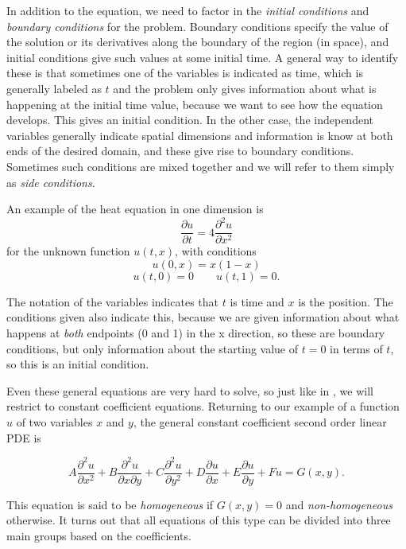 In addition to the equation, we need to factor in the \emph{initial conditions} and \emph{boundary conditions} for the problem. Boundary conditions specify the value of the solution or its derivatives along the boundary of the region (in space), and initial conditions give such values at some initial time. A general way to identify these is that sometimes one of the variables is indicated as time, which is generally labeled as $t$ and the problem only gives information about what is happening at the initial time value, because we want to see how the equation develops. This gives an initial condition. In the other case, the independent variables generally indicate spatial dimensions and information is know at both ends of the desired domain, and these give rise to boundary conditions. Sometimes such conditions are mixed together and we will refer to them
simply as 
\emph{side conditions}.

\begin{example}
An example of the heat equation in one dimension is
\[ \frac{\partial u}{\partial t} = 4 \frac{\partial^2 u}{\partial x^2} \] for the unknown function $u(t,x)$, with conditions 
\[ u(0, x) = x(1-x) \]
\[ u(t,0) = 0 \qquad u(t, 1) = 0. \]

The notation of the variables indicates that $t$ is time and $x$ is the position. The conditions given also indicate this, because we are given information about what happens at \emph{both} endpoints (0 and 1) in the x direction, so these are boundary conditions, but only information about the starting value of $t=0$ in terms of $t$, so this is an initial condition. 
\end{example}

Even these general equations are very hard to solve, so just like in , we will restrict to constant coefficient equations. Returning to our example of a function $u$ of two variables $x$ and $y$, the general constant coefficient second order linear PDE is 

\begin{equation}
A\frac{\partial^2 u}{\partial x^2} + B\frac{\partial^2u}{\partial x \partial y} + C \frac{\partial ^2 u}{\partial y^2} + D \frac{\partial u}{\partial x} + E \frac{\partial u}{\partial y} + F u = G(x,y).
\label{eq:solinPDE}
\end{equation}

This equation is said to be \emph{homogeneous} if $G(x,y) = 0$ and \emph{non-homogeneous} otherwise. It turns out that all equations of this type can be divided into three main groups based on the coefficients.

